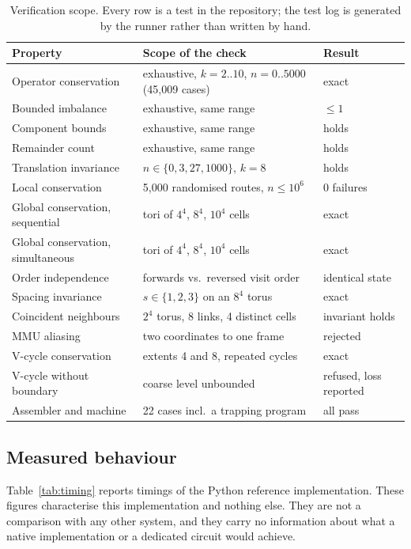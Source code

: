 \documentclass[11pt,a4paper]{article}
\theoremstyle{definition}
\begin{document}
\begin{table}[h]
\centering
\small
\begin{tabular}{@{}p{5.4cm}p{5.6cm}p{3.2cm}@{}}
\toprule
Property & Scope of the check & Result \\
\midrule
Operator conservation & exhaustive, $k = 2..10$, $n = 0..5000$ (45{,}009 cases) & exact \\
Bounded imbalance & exhaustive, same range & $\leq 1$ \\
Component bounds & exhaustive, same range & holds \\
Remainder count & exhaustive, same range & holds \\
Translation invariance & $n \in \{0,3,27,1000\}$, $k = 8$ & holds \\
\midrule
Local conservation & 5{,}000 randomised routes, $n \leq 10^6$ & 0 failures \\
Global conservation, sequential & tori of $4^4$, $8^4$, $10^4$ cells & exact \\
Global conservation, simultaneous & tori of $4^4$, $8^4$, $10^4$ cells & exact \\
Order independence & forwards vs.\ reversed visit order & identical state \\
Spacing invariance & $s \in \{1,2,3\}$ on an $8^4$ torus & exact \\
\midrule
Coincident neighbours & $2^4$ torus, 8 links, 4 distinct cells & invariant holds \\
MMU aliasing & two coordinates to one frame & rejected \\
\midrule
V-cycle conservation & extents 4 and 8, repeated cycles & exact \\
V-cycle without boundary & coarse level unbounded & refused, loss reported \\
\midrule
Assembler and machine & 22 cases incl.\ a trapping program & all pass \\
\bottomrule
\end{tabular}
\caption{Verification scope. Every row is a test in the repository; the test
log is generated by the runner rather than written by hand.}
\label{tab:verify}
\end{table}

\subsection{Measured behaviour}

Table~\ref{tab:timing} reports timings of the Python reference implementation.
These figures characterise this implementation and nothing else. They are not a
comparison with any other system, and they carry no information about what a
native implementation or a dedicated circuit would achieve.
\end{document}
